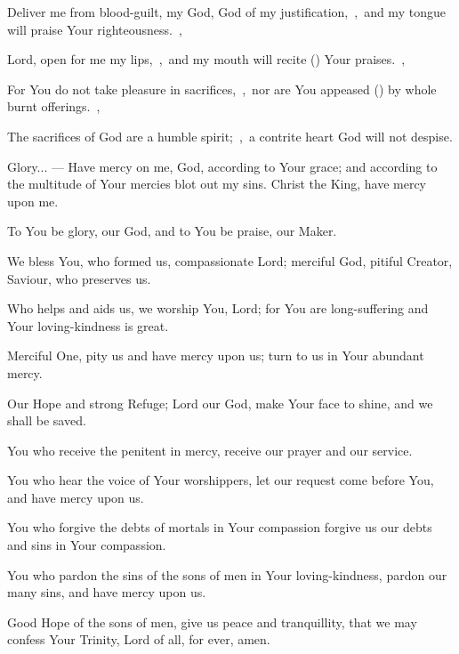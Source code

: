 \documentclass[12pt,twoside,a5paper]{article}
\begin{document}
\begin{halfparskip}
  Deliver me from blood-guilt, my God, God of my justification,~\sep\ and my tongue will praise Your righteousness.~\sep

  Lord, open for me my lips,~\sep\ and my mouth will recite () Your praises.~\sep

  For You do not take pleasure in sacrifices,~\sep\ nor are You appeased () by whole burnt offerings.~\sep

  The sacrifices of God are a humble spirit;~\sep\ a contrite heart God will not despise.

  Glory... ---  Have mercy on me, God, according to Your grace; and according to the multitude of Your mercies blot out my sins. Christ the King, have mercy upon me.
\end{halfparskip}



\begin{halfparskip}

  To You be glory, our God, and to You be praise, our Maker.

  We bless You, who formed us, compassionate Lord; merciful God, pitiful Creator, Saviour, who preserves us.

  Who helps and aids us, we worship You, Lord; for You are long-suffering and Your loving-kindness is great.

  Merciful One, pity us and have mercy upon us; turn to us in Your abundant mercy.

  Our Hope and strong Refuge; Lord our God, make Your face to shine, and we shall be saved.

  You who receive the penitent in mercy, receive our prayer and our service.

  You who hear the voice of Your worshippers, let our request come before You, and have mercy upon us.

  You who forgive the debts of mortals in Your compassion forgive us our debts and sins in Your compassion.

  You who pardon the sins of the sons of men in Your loving-kindness, pardon our many sins, and have mercy upon us.

  Good Hope of the sons of men, give us peace and tranquillity, that we may confess Your Trinity, Lord of all, for ever, amen. 
\end{halfparskip}
\end{document}
